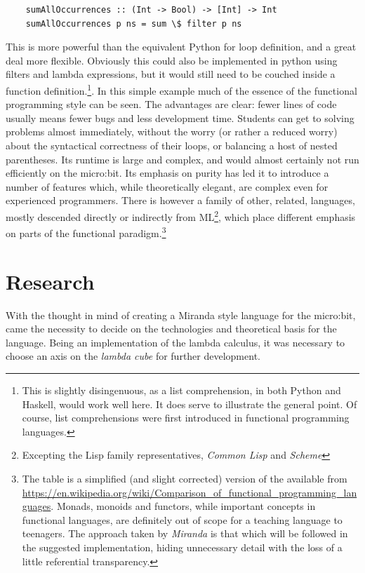 \documentclass[12pt, a4paper]{report}
\begin{document}
\begin{verbatim}
    sumAllOccurrences :: (Int -> Bool) -> [Int] -> Int
    sumAllOccurrences p ns = sum \$ filter p ns
\end{verbatim}

This is more powerful than the equivalent Python for loop definition, and a great deal more
flexible. Obviously this could also be implemented in python using filters and lambda expressions,
but it would still need to be couched inside a function definition.\footnote{This is slightly
disingenuous, as a list comprehension, in both Python and Haskell, would work well here. It does
serve to illustrate the general point. Of course, list comprehensions were first introduced in
functional programming languages.}. In this simple example much of the essence of the functional
programming style can be seen. The advantages are clear: fewer lines of code usually means fewer bugs and less
development time. Students can get to solving problems almost immediately, without the worry (or
rather a reduced worry) about the syntactical correctness of their loops, or balancing a host of
nested parentheses. 
Its runtime is large and complex, and would almost certainly not run efficiently on the micro:bit. 
Its emphasis on purity has led it to introduce a number of features which, while theoretically elegant, are
complex even for experienced programmers. There is however a family of other, related, languages, mostly
descended directly or indirectly from ML\footnote{Excepting the Lisp family representatives,
\textit{Common Lisp} and \textit{Scheme}}, which place different emphasis on parts of the functional
paradigm.\footnote{The table is a simplified (and slight corrected) version of the available from
\url{https://en.wikipedia.org/wiki/Comparison_of_functional_programming_languages}. Monads, monoids
and functors, while important concepts in functional languages, are definitely out of scope for a
teaching language to teenagers. The approach taken by \textit{Miranda} is that which will be followed
in the suggested implementation, hiding unnecessary detail with the loss of a little referential
transparency.}

\section{Research}
With the thought in mind of creating a Miranda style language for the micro:bit, came the necessity
to decide on the technologies and theoretical basis for the language. Being an implementation of the
lambda calculus, it was necessary to choose an axis on the \textit{lambda cube} for further
development. 
\end{document}
